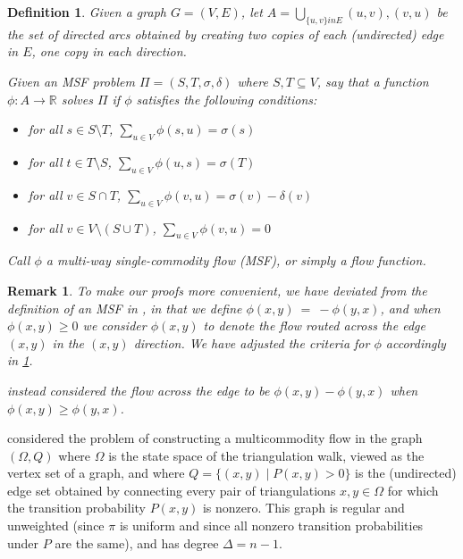 \documentclass[a4paper, 12p]{article}
\numberwithin{equation}{section}
\newtheorem{remark}[theorem]{Remark}
\newtheorem{definition}[theorem]{Definition}
\begin{document}
\begin{definition}
Given a graph $G = (V, E)$, let $A = \bigcup_{\{u, v\} in E}{(u, v), (v, u)}$ be the set of directed arcs obtained by creating two copies of each (undirected) edge in $E$, one copy in each direction.

Given an MSF problem $\Pi = (S, T, \sigma, \delta)$ where $S, T \subseteq V$, say that a function $\phi: A \rightarrow \mathbb{R}$ \emph{solves} $\Pi$ if $\phi$ satisfies the following conditions:

\begin{itemize}
    \item for all $s \in S \setminus T$, $\sum_{u \in V} \phi(s, u) = \sigma(s)$
    \item for all $t \in T \setminus S$, $\sum_{u \in V} \phi(u, s) = \sigma(T)$
    \item for all $v \in S \cap T$, $\sum_{u \in V} \phi(v, u) = \sigma(v) - \delta(v)$
    \item for all $v \in V \setminus (S \cup T)$, $\sum_{u \in V} \phi(v, u) = 0$
\end{itemize}

Call $\phi$ a \emph{multi-way single-commodity flow (MSF)}, or simply a \emph{flow function}. 
    \label{def:msf}
\end{definition}

\begin{remark}
    To make our proofs more convenient, we have deviated from the definition of an MSF in \cite{eppstein2022improved}, in that we define $\phi(x,y)~=~-\phi(y, x)$, and when $\phi(x, y) \geq 0$ we consider $\phi(x, y)$ to denote the flow routed across the edge $(x, y)$ in the $(x, y)$ direction. We have adjusted the criteria for $\phi$ accordingly in \cref{def:msf}.
    
    \cite{eppstein2022improved} instead considered the flow across the edge to be $\phi(x, y) - \phi(y, x)$ when $\phi(x, y) \geq \phi(y, x)$. 
\end{remark}

\cite{eppstein2022improved} considered the problem of constructing a multicommodity flow in the graph $(\Omega, Q)$ where $\Omega$ is the state space of the triangulation walk, viewed as the vertex set of a graph, and where $Q = \{(x, y) \mid P(x, y) > 0\}$ is the (undirected) edge set obtained by connecting every pair of triangulations $x, y \in \Omega$ for which the transition probability $P(x, y)$ is nonzero. This graph is regular and unweighted (since $\pi$ is uniform and since all nonzero transition probabilities under $P$ are the same), and has degree $\Delta = n - 1$.
\end{document}
